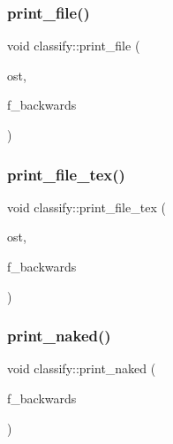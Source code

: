 \subsubsection{\texorpdfstring{print\+\_\+file()}{print\_file()}}
{\footnotesize\ttfamily void classify\+::print\+\_\+file (\begin{DoxyParamCaption}\item[{ostream \&}]{ost,  }\item[{\mbox{\hyperlink{galois_8h_a09fddde158a3a20bd2dcadb609de11dc}{I\+NT}}}]{f\+\_\+backwards }\end{DoxyParamCaption})}

\mbox{\label{classclassify_a10332f3ce5f2b7df7767d3c6b02aaa58}} 
\subsubsection{\texorpdfstring{print\+\_\+file\+\_\+tex()}{print\_file\_tex()}}
{\footnotesize\ttfamily void classify\+::print\+\_\+file\+\_\+tex (\begin{DoxyParamCaption}\item[{ostream \&}]{ost,  }\item[{\mbox{\hyperlink{galois_8h_a09fddde158a3a20bd2dcadb609de11dc}{I\+NT}}}]{f\+\_\+backwards }\end{DoxyParamCaption})}

\mbox{\label{classclassify_ae9b3a00649b393290673bf96c1630996}} 
\subsubsection{\texorpdfstring{print\+\_\+naked()}{print\_naked()}}
{\footnotesize\ttfamily void classify\+::print\+\_\+naked (\begin{DoxyParamCaption}\item[{\mbox{\hyperlink{galois_8h_a09fddde158a3a20bd2dcadb609de11dc}{I\+NT}}}]{f\+\_\+backwards }\end{DoxyParamCaption})}

\mbox{\label{classclassify_ad01a54dbdaa22d7a7c8e952850dcc3be}} 

